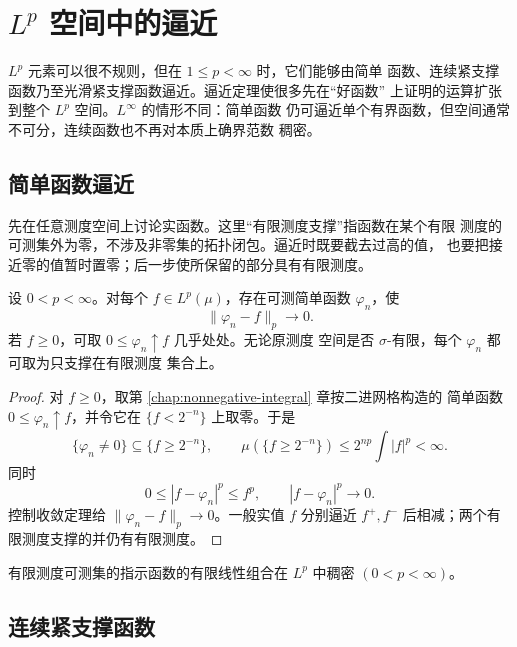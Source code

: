 \chapter{\texorpdfstring{\(L^p\)}{Lp} 空间中的逼近}
\label{chap:lp-approximation}

\(L^p\) 元素可以很不规则，但在 \(1\le p<\infty\) 时，它们能够由简单
函数、连续紧支撑函数乃至光滑紧支撑函数逼近。逼近定理使很多先在“好函数”
上证明的运算扩张到整个 \(L^p\) 空间。\(L^\infty\) 的情形不同：简单函数
仍可逼近单个有界函数，但空间通常不可分，连续函数也不再对本质上确界范数
稠密。

\section{简单函数逼近}

先在任意测度空间上讨论实函数。这里“有限测度支撑”指函数在某个有限
测度的可测集外为零，不涉及非零集的拓扑闭包。逼近时既要截去过高的值，
也要把接近零的值暂时置零；后一步使所保留的部分具有有限测度。

\begin{theorem}
\label{thm:simple-dense-lp}
设 \(0<p<\infty\)。对每个 \(f\in L^p(\mu)\)，存在可测简单函数
\(\varphi_n\)，使
\[
 \|\varphi_n-f\|_p\longrightarrow0.
\]
若 \(f\ge0\)，可取 \(0\le\varphi_n\uparrow f\) 几乎处处。无论原测度
空间是否 \(\sigma\)-有限，每个 \(\varphi_n\) 都可取为只支撑在有限测度
集合上。
\end{theorem}

\begin{proof}
对 \(f\ge0\)，取第 \ref{chap:nonnegative-integral} 章按二进网格构造的
简单函数 \(0\le\varphi_n\uparrow f\)，并令它在
\(\{f<2^{-n}\}\) 上取零。于是
\[
 \{\varphi_n\ne0\}
 \subseteq\{f\ge2^{-n}\},
 \qquad
 \mu(\{f\ge2^{-n}\})
 \le 2^{np}\int|f|^p<\infty.
\]
同时
\[
 0\le|f-\varphi_n|^p\le f^p,\qquad
 |f-\varphi_n|^p\to0.
\]
控制收敛定理给 \(\|\varphi_n-f\|_p\to0\)。一般实值 \(f\) 分别逼近
\(f^+,f^-\) 后相减；两个有限测度支撑的并仍有有限测度。
\end{proof}

\begin{corollary}
\label{cor:indicator-span-dense}
有限测度可测集的指示函数的有限线性组合在 \(L^p\) 中稠密
\((0<p<\infty)\)。
\end{corollary}

\section{连续紧支撑函数}

